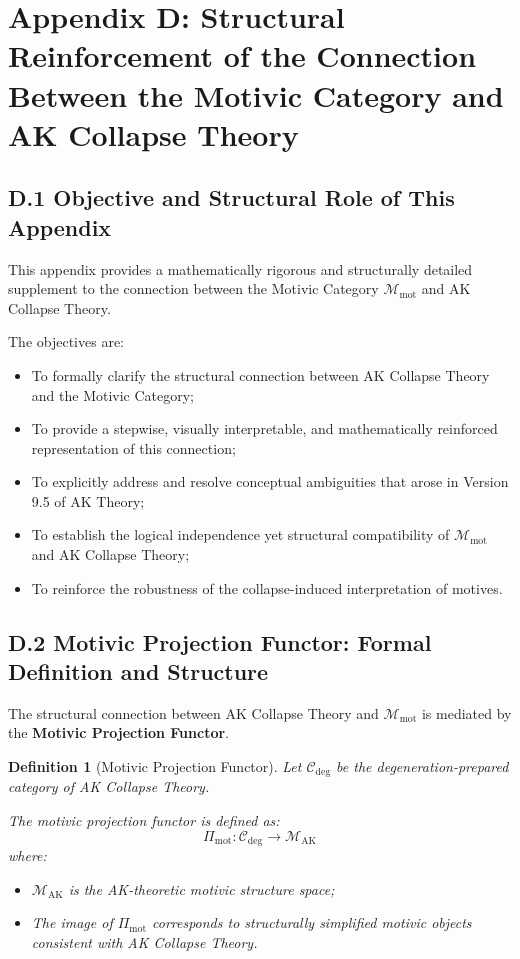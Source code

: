 \documentclass[11pt]{article}
\newtheorem{definition}[theorem]{Definition}
\begin{document}
\section*{Appendix D: Structural Reinforcement of the Connection Between the Motivic Category and AK Collapse Theory}

\subsection*{D.1 Objective and Structural Role of This Appendix}

This appendix provides a mathematically rigorous and structurally detailed supplement to the connection between the Motivic Category $\mathcal{M}_{\mathrm{mot}}$ and AK Collapse Theory.

The objectives are:

\begin{itemize}
    \item To formally clarify the structural connection between AK Collapse Theory and the Motivic Category;
    \item To provide a stepwise, visually interpretable, and mathematically reinforced representation of this connection;
    \item To explicitly address and resolve conceptual ambiguities that arose in Version 9.5 of AK Theory;
    \item To establish the logical independence yet structural compatibility of $\mathcal{M}_{\mathrm{mot}}$ and AK Collapse Theory;
    \item To reinforce the robustness of the collapse-induced interpretation of motives.
\end{itemize}

\subsection*{D.2 Motivic Projection Functor: Formal Definition and Structure}

The structural connection between AK Collapse Theory and $\mathcal{M}_{\mathrm{mot}}$ is mediated by the \textbf{Motivic Projection Functor}.

\begin{definition}[Motivic Projection Functor]
Let $\mathcal{C}_{\mathrm{deg}}$ be the degeneration-prepared category of AK Collapse Theory.

The motivic projection functor is defined as:
\[
\Pi_{\mathrm{mot}} : \mathcal{C}_{\mathrm{deg}} \longrightarrow \mathcal{M}_{\mathrm{AK}}
\]
where:
\begin{itemize}
    \item $\mathcal{M}_{\mathrm{AK}}$ is the AK-theoretic motivic structure space;
    \item The image of $\Pi_{\mathrm{mot}}$ corresponds to structurally simplified motivic objects consistent with AK Collapse Theory.
\end{itemize}
\end{definition}
\end{document}
